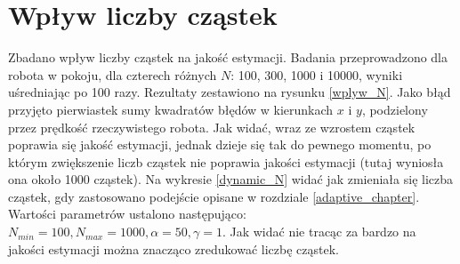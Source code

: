 \section{Wpływ liczby cząstek}
Zbadano wpływ liczby cząstek na jakość estymacji. Badania przeprowadzono dla  robota w pokoju, dla czterech różnych $N$: 100, 300, 1000 i 10000, wyniki uśredniając po 100 razy. Rezultaty zestawiono na rysunku \ref{wplyw_N}. Jako błąd przyjęto pierwiastek sumy kwadratów błędów w kierunkach $x$ i $y$, podzielony przez prędkość rzeczywistego robota. Jak widać, wraz ze wzrostem cząstek poprawia się jakość estymacji, jednak dzieje się tak do pewnego momentu, po którym zwiększenie liczb cząstek nie poprawia jakości estymacji (tutaj wyniosła ona około 1000 cząstek). Na wykresie \ref{dynamic_N} widać jak zmieniała się liczba cząstek, gdy zastosowano podejście opisane w rozdziale \ref{adaptive_chapter}. Wartości parametrów ustalono następująco: $N_{min}=100, N_{max}=1000, \alpha = 50, \gamma = 1$.  Jak widać nie tracąc za bardzo na jakości estymacji można znacząco zredukować liczbę cząstek.

